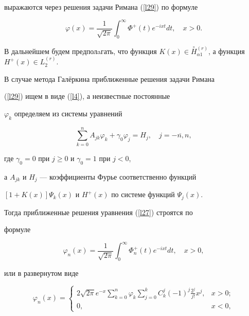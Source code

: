 выражаются через решения задачи Римана (\ref{l29}) по формуле


\begin{equation}


\label{l30} \varphi(x)=\frac{1}{\sqrt{2\pi}}\int_0^\infty


\Phi^+(t)e^{-ixt}dt, \quad x > 0.


\end{equation}


В дальнейшем будем предполaгать, что функция $K(x)\in


\overset{\circ}{H}{}^{(r)}_{\alpha1}$, а функция $H^+(x)\in


L_2^{(r)}$.





В случае метода Гал\"еркина приближенные решения задачи Римана


(\ref{l29}) ищем в виде (\ref{l4}), а неизвестные постоянные


$\varphi_k$ определяем из системы уравнений


\begin{equation}


\label{l31} \sum\limits_{k=0}^n


A_{jk}\varphi_k+\gamma_0\varphi_j=H_j, \quad j=\overline{-n,n},


\end{equation}


где $\gamma_0=0$ при $j\geqslant 0$ и $\gamma_0 = 1$ при $j < 0$,


а $A_{jk}$ и $H_j$ --- коэффициенты Фурье соответственно функций


$[1+K(x)]\Psi_k(x)$ и $H^+(x)$ по системе функций $\Psi_j(x)$.


Тогда приближенные решения уравнения (\ref{l27}) строятся по


формуле


\begin{equation}


\label{l32} \varphi_n(x)=\frac{1}{\sqrt{2\pi}}\int_0^\infty


\Phi^+_n(t)e^{-ixt}dt, \quad x > 0,


\end{equation}


или в развернутом виде


\begin{equation}


\label{myeq}


\varphi_n(x)=


\begin{cases}


2\sqrt{2\pi}e^{-x}


{\displaystyle\sum\limits_{k=0}^n}\varphi_k{\displaystyle\sum\limits_{j=0}^k}


C_k^j(-1)^j{\displaystyle\frac{2^j}{j!}}x^j, & x > 0; \\


0, & x < 0,


\end{cases}


\end{equation}


